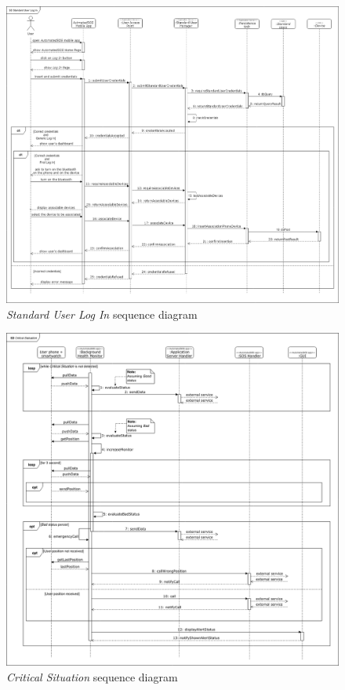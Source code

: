 \begin{figure}[H]
  \begin{center}
  	\includegraphics[width=\textwidth]{./img/sequence/appLogIn.png}
    \hspace{0.05\linewidth}
    \centering
    \caption{\textit{Standard User Log In} sequence diagram}
		\label{img:appLogIn}
    \end{center}
\end{figure}

\begin{figure}[H]
  \begin{center}
  	\includegraphics[width=\textwidth]{./img/sequence/criticalSituation.png}
    \hspace{0.05\linewidth}
    \centering
    \caption{\textit{Critical Situation} sequence diagram}
		\label{img:criticalSituation}
    \end{center}
\end{figure}

